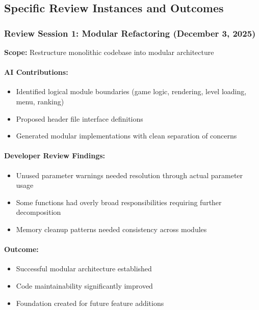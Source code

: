 \documentclass[12pt,a4paper]{article}
\begin{document}
\subsection{Specific Review Instances and Outcomes}

\subsubsection{Review Session 1: Modular Refactoring (December 3, 2025)}

\textbf{Scope:} Restructure monolithic codebase into modular architecture

\paragraph{AI Contributions:}
\begin{itemize}
    \item Identified logical module boundaries (game logic, rendering, level loading, menu, ranking)
    \item Proposed header file interface definitions
    \item Generated modular implementations with clean separation of concerns
\end{itemize}

\paragraph{Developer Review Findings:}
\begin{itemize}
    \item Unused parameter warnings needed resolution through actual parameter usage
    \item Some functions had overly broad responsibilities requiring further decomposition
    \item Memory cleanup patterns needed consistency across modules
\end{itemize}

\paragraph{Outcome:}
\begin{itemize}
    \item Successful modular architecture established
    \item Code maintainability significantly improved
    \item Foundation created for future feature additions
\end{itemize}
\end{document}
